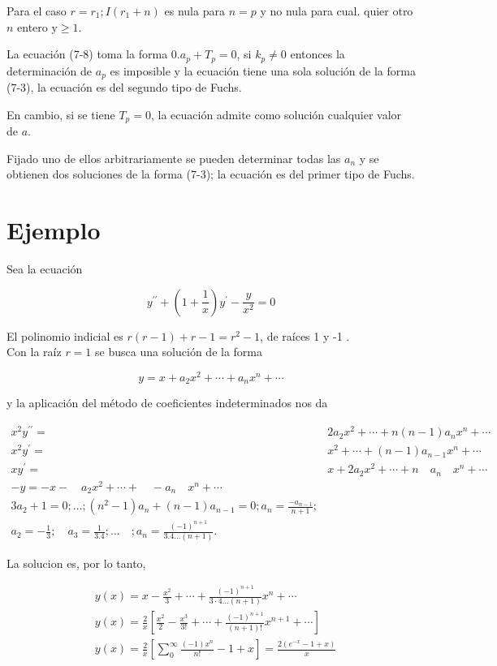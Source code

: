 \documentclass[10pt]{article}
\theoremstyle{plain}
\theoremstyle{definition}
\theoremstyle{remark}
\begin{document}
Para el caso $r=r_{1} ; I\left(r_{1}+n\right)$ es nula para $n=p$ y no nula para cual. quier otro $n$ entero $\mathrm{y} \geqslant 1$.

La ecuación (7-8) toma la forma $0 . a_{p}+T_{p}=0$, si $k_{p} \neq 0$ entonces la determinación de $a_{p}$ es imposible y la ecuación tiene una sola solución de la forma (7-3), la ecuación es del segundo tipo de Fuchs.

En cambio, si se tiene $T_{p}=0$, la ecuación admite como solución cualquier valor de $a$.

Fijado uno de ellos arbitrariamente se pueden determinar todas las $a_{n}$ y se obtienen dos soluciones de la forma (7-3); la ecuación es del primer tipo de Fuchs.

\section*{Ejemplo}
Sea la ecuación

$$
y^{\prime \prime}+\left(1+\frac{1}{x}\right) y^{\prime}-\frac{y}{x^{2}}=0
$$

El polinomio indicial es $r(r-1)+r-1=r^{2}-1$, de raíces 1 y -1 .\\
Con la raíz $r=1$ se busca una solución de la forma

$$
y=x+a_{2} x^{2}+\cdots+a_{n} x^{n}+\cdots
$$

y la aplicación del método de coeficientes indeterminados nos da

$$
\begin{array}{cc}
x^{2} y^{\prime \prime}= & 2 a_{2} x^{2}+\cdots+n(n-1) a_{n} x^{n}+\cdots \\
x^{2} y^{\prime}= & x^{2}+\cdots+(n-1) a_{n-1} x^{n}+\cdots \\
x y^{\prime}= & x+2 a_{2} x^{2}+\cdots+n \quad a_{n} \quad x^{n}+\cdots \\
-y=-x-\quad a_{2} x^{2}+\cdots+\quad-a_{n} \quad x^{n}+\cdots \\
3 a_{2}+1=0 ; \ldots ;\left(n^{2}-1\right) a_{n}+(n-1) a_{n-1}=0 ; a_{n}=\frac{-a_{n-1}}{n+1} ; \\
a_{2}=-\frac{1}{3} ; \quad a_{3}=\frac{1}{3.4} ; \ldots \quad ; a_{n}=\frac{(-1)^{n+1}}{3.4 \ldots(n+1)} .
\end{array}
$$

La solucion es, por lo tanto,

$$
\begin{aligned}
& y(x)=x-\frac{x^{2}}{3}+\cdots+\frac{(-1)^{n+1}}{3 \cdot 4 \ldots(n+1)} x^{n}+\cdots \\
& y(x)=\frac{2}{x}\left[\frac{x^{2}}{2}-\frac{x^{3}}{3!}+\cdots+\frac{(-1)^{n+1}}{(n+1)!} x^{n+1}+\cdots\right] \\
& y(x)=\frac{2}{x}\left[\sum_{0}^{\infty} \frac{(-1) x^{n}}{n!}-1+x\right]=\frac{2\left(e^{-x}-1+x\right)}{x}
\end{aligned}
$$
\end{document}

